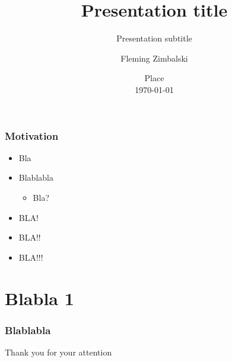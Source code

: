 \documentclass[unknownkeysallowed,xcolor=dvipsnames,aspectratio=169,compress]{beamer}
\title{Presentation title}
\subtitle{Presentation subtitle}
\author{Fleming Zimbalski\inst{$\dagger$}} %
\institute{
\inst{$\dagger$}%
European University Institute %
}
\date{
Place \\
\today
} %
\begin{document}
\begin{frame}[noframenumbering] %
\titlepage %
\thispagestyle{empty} %
\end{frame}



\begin{frame}
\frametitle{Motivation}
\begin{itemize}
\item Bla
\item Blablabla
\begin{itemize}
\item Bla?
\end{itemize}
\item \alert{BLA!}
\item \textcolor{EUIGreen}{BLA!!}
\item \textcolor{EUICarolina}{BLA!!!}
\end{itemize}
\end{frame}

\section{Blabla 1}

\begin{frame}
\frametitle{Blablabla}

\end{frame}



\appendix
\begin{frame}[standout]
\LARGE{\centerline{Thank you for your attention}}
\end{frame}


\end{document}
